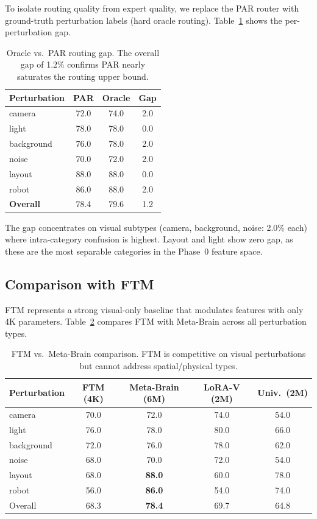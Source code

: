 \documentclass[conference]{article}
\newcommand{\ours}{Meta-Brain}
\begin{document}
To isolate routing quality from expert quality, we replace the PAR router with ground-truth perturbation labels (hard oracle routing).
Table~\ref{tab:oracle} shows the per-perturbation gap.

\begin{table}[h]
\centering
\caption{Oracle vs.\ PAR routing gap. The overall gap of 1.2\% confirms PAR nearly saturates the routing upper bound.}
\label{tab:oracle}
\small
\begin{tabular}{lccc}
\toprule
Perturbation & PAR & Oracle & Gap \\
\midrule
camera & 72.0 & 74.0 & 2.0 \\
light & 78.0 & 78.0 & 0.0 \\
background & 76.0 & 78.0 & 2.0 \\
noise & 70.0 & 72.0 & 2.0 \\
layout & 88.0 & 88.0 & 0.0 \\
robot & 86.0 & 88.0 & 2.0 \\
\midrule
\textbf{Overall} & 78.4 & 79.6 & 1.2 \\
\bottomrule
\end{tabular}
\end{table}

The gap concentrates on visual subtypes (camera, background, noise: 2.0\% each) where intra-category confusion is highest. Layout and light show zero gap, as these are the most separable categories in the Phase~0 feature space.

\subsection{Comparison with FTM}
\label{sec:ftm}

FTM represents a strong visual-only baseline that modulates features with only 4K parameters.
Table~\ref{tab:ftm} compares FTM with \ours{} across all perturbation types.

\begin{table}[h]
\centering
\caption{FTM vs.\ \ours{} comparison. FTM is competitive on visual perturbations but cannot address spatial/physical types.}
\label{tab:ftm}
\small
\begin{tabular}{lcccc}
\toprule
Perturbation & FTM (4K) & \ours{} (6M) & LoRA-V (2M) & Univ.\ (2M) \\
\midrule
camera & 70.0 & 72.0 & 74.0 & 54.0 \\
light & 76.0 & 78.0 & 80.0 & 66.0 \\
background & 72.0 & 76.0 & 78.0 & 62.0 \\
noise & 68.0 & 70.0 & 72.0 & 54.0 \\
layout & 68.0 & \textbf{88.0} & 60.0 & 78.0 \\
robot & 56.0 & \textbf{86.0} & 54.0 & 74.0 \\
\midrule
Overall & 68.3 & \textbf{78.4} & 69.7 & 64.8 \\
\bottomrule
\end{tabular}
\end{table}
\end{document}
